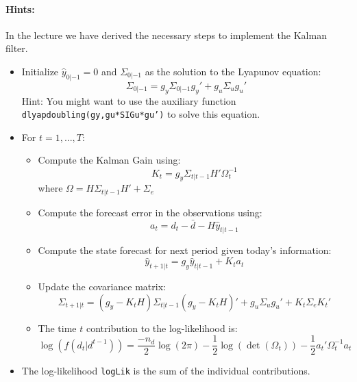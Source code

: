 \documentclass{article}
\begin{document}
\paragraph{Hints:}
In the lecture we have derived the necessary steps to implement the Kalman filter.
\begin{itemize}
\item Initialize $\hat{y}_{0|-1}=0$ and $\Sigma_{0|-1}$ as the solution to the Lyapunov equation:
$$\Sigma_{0|-1} = g_y \Sigma_{0|-1} g_y' + g_u \Sigma_u g_u'$$
Hint: You might want to use the auxiliary function \texttt{dlyapdoubling(gy,gu*SIGu*gu')} to solve this equation.
\item For $t=1,...,T$:
\begin{itemize}
	\item Compute the Kalman Gain using: $$K_t = g_y \Sigma_{t|t-1} H' \Omega_t^{-1}$$ where $\Omega=H \Sigma_{t|t-1} H' + \Sigma_e$		
	\item Compute the forecast error in the observations using: $$a_t=d_t - \bar{d} - H \hat{y}_{t|t-1}$$		
	\item Compute the state forecast for next period given today's information: $$\hat{y}_{t+1|t} = g_y \hat{y}_{t|t-1} + K_t a_t$$
	\item Update the covariance matrix: $$\Sigma_{t+1|t} = (g_y - K_t H) \Sigma_{t|t-1} (g_y - K_t H)' + g_u \Sigma_u g_u' + K_t \Sigma_e K_t'$$
	\item The time \(t\) contribution to the log-likelihood is:
	$$\log(f(d_t|d^{t-1})) = \frac{-n_d}{2}\log(2\pi) -\frac{1}{2}\log(\det(\Omega_t)) - \frac{1}{2} a_t' \Omega_t^{-1} a_t$$
\end{itemize}
\item The log-likelihood \texttt{logLik} is the sum of the individual contributions.
\end{itemize}



\newpage
\end{document}

